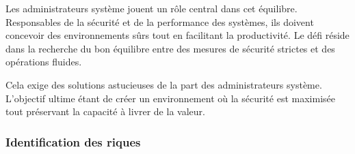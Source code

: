 Les administrateurs système jouent un rôle central dans cet équilibre.
Responsables de la sécurité et de la performance des systèmes, ils doivent concevoir des environnements sûrs tout en facilitant la productivité.
Le défi réside dans la recherche du bon équilibre entre des mesures de sécurité strictes et des opérations fluides.

Cela exige des solutions astucieuses de la part des administrateurs système.
L'objectif ultime étant de créer un environnement où la sécurité est maximisée tout préservant la capacité à livrer de la valeur.

\subsubsection{Identification des riques}